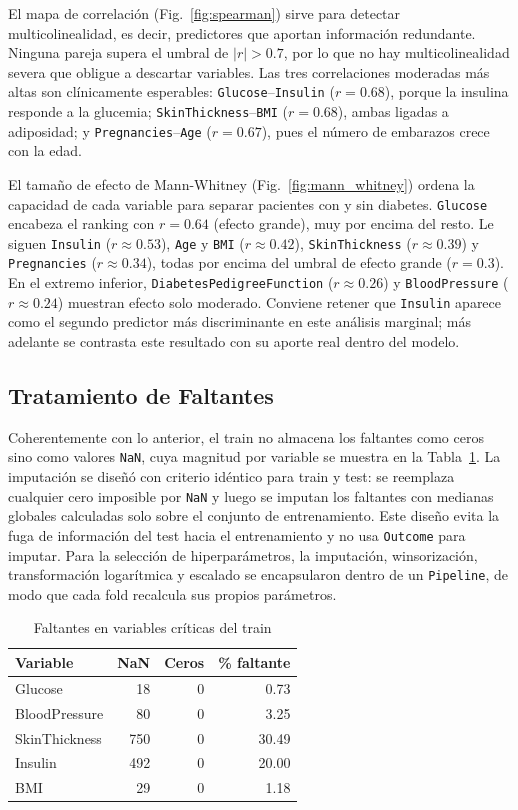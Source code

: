 \documentclass[conference]{IEEEtran}
\newcommand{\code}[1]{\texttt{#1}}
\begin{document}
El mapa de correlación (Fig.~\ref{fig:spearman}) sirve para detectar multicolinealidad, es decir, predictores que aportan información redundante. Ninguna pareja supera el umbral de $|r|>0.7$, por lo que no hay multicolinealidad severa que obligue a descartar variables. Las tres correlaciones moderadas más altas son clínicamente esperables: \code{Glucose}--\code{Insulin} ($r=0.68$), porque la insulina responde a la glucemia; \code{SkinThickness}--\code{BMI} ($r=0.68$), ambas ligadas a adiposidad; y \code{Pregnancies}--\code{Age} ($r=0.67$), pues el número de embarazos crece con la edad.

El tamaño de efecto de Mann-Whitney (Fig.~\ref{fig:mann_whitney}) ordena la capacidad de cada variable para separar pacientes con y sin diabetes. \code{Glucose} encabeza el ranking con $r=0.64$ (efecto grande), muy por encima del resto. Le siguen \code{Insulin} ($r\approx0.53$), \code{Age} y \code{BMI} ($r\approx0.42$), \code{SkinThickness} ($r\approx0.39$) y \code{Pregnancies} ($r\approx0.34$), todas por encima del umbral de efecto grande ($r=0.3$). En el extremo inferior, \code{DiabetesPedigreeFunction} ($r\approx0.26$) y \code{BloodPressure} ($r\approx0.24$) muestran efecto solo moderado. Conviene retener que \code{Insulin} aparece como el segundo predictor más discriminante en este análisis marginal; más adelante se contrasta este resultado con su aporte real dentro del modelo.

\subsection{Tratamiento de Faltantes}

Coherentemente con lo anterior, el train no almacena los faltantes como ceros sino como valores \code{NaN}, cuya magnitud por variable se muestra en la Tabla~\ref{tab:faltantes}. La imputación se diseñó con criterio idéntico para train y test: se reemplaza cualquier cero imposible por \code{NaN} y luego se imputan los faltantes con medianas globales calculadas solo sobre el conjunto de entrenamiento. Este diseño evita la fuga de información del test hacia el entrenamiento y no usa \code{Outcome} para imputar. Para la selección de hiperparámetros, la imputación, winsorización, transformación logarítmica y escalado se encapsularon dentro de un \code{Pipeline}, de modo que cada fold recalcula sus propios parámetros.

\begin{table}[H]
\centering
\caption{Faltantes en variables críticas del train}
\label{tab:faltantes}
\scriptsize
\begin{tabular}{@{}lrrr@{}}
\toprule
\textbf{Variable} & \textbf{NaN} & \textbf{Ceros} & \textbf{\% faltante} \\
\midrule
Glucose       & 18  & 0 & 0.73 \\
BloodPressure & 80  & 0 & 3.25 \\
SkinThickness & 750 & 0 & 30.49 \\
Insulin       & 492 & 0 & 20.00 \\
BMI           & 29  & 0 & 1.18 \\
\bottomrule
\end{tabular}
\end{table}
\end{document}
